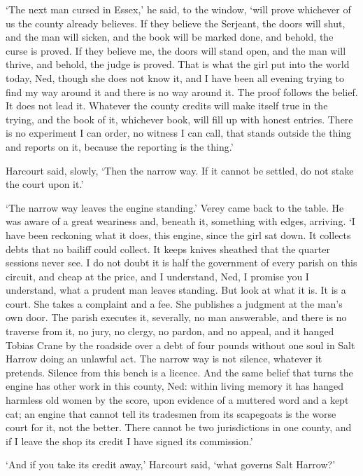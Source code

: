 \documentclass[11pt]{article}
\begin{document}
`The next man cursed in Essex,' he said, to the window, `will prove whichever of us the county already believes. If they believe the Serjeant, the doors will shut, and the man will sicken, and the book will be marked done, and behold, the curse is proved. If they believe me, the doors will stand open, and the man will thrive, and behold, the judge is proved. That is what the girl put into the world today, Ned, though she does not know it, and I have been all evening trying to find my way around it and there is no way around it. The proof follows the belief. It does not lead it. Whatever the county credits will make itself true in the trying, and the book of it, whichever book, will fill up with honest entries. There is no experiment I can order, no witness I can call, that stands outside the thing and reports on it, because the reporting is the thing.'

Harcourt said, slowly, `Then the narrow way. If it cannot be settled, do not stake the court upon it.'

`The narrow way leaves the engine standing.' Verey came back to the table. He was aware of a great weariness and, beneath it, something with edges, arriving. `I have been reckoning what it does, this engine, since the girl sat down. It collects debts that no bailiff could collect. It keeps knives sheathed that the quarter sessions never see. I do not doubt it is half the government of every parish on this circuit, and cheap at the price, and I understand, Ned, I promise you I understand, what a prudent man leaves standing. But look at what it is. It is a court. She takes a complaint and a fee. She publishes a judgment at the man's own door. The parish executes it, severally, no man answerable, and there is no traverse from it, no jury, no clergy, no pardon, and no appeal, and it hanged Tobias Crane by the roadside over a debt of four pounds without one soul in Salt Harrow doing an unlawful act. The narrow way is not silence, whatever it pretends. Silence from this bench is a licence. And the same belief that turns the engine has other work in this county, Ned: within living memory it has hanged harmless old women by the score, upon evidence of a muttered word and a kept cat; an engine that cannot tell its tradesmen from its scapegoats is the worse court for it, not the better. There cannot be two jurisdictions in one county, and if I leave the shop its credit I have signed its commission.'

`And if you take its credit away,' Harcourt said, `what governs Salt Harrow?'
\end{document}
